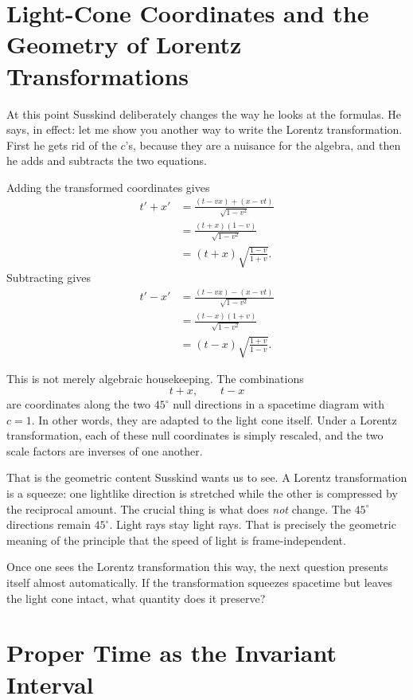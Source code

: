 \section{Light-Cone Coordinates and the Geometry of Lorentz Transformations}

At this point Susskind deliberately changes the way he looks at the formulas. He says, in effect: let me show you another way to write the Lorentz transformation. First he gets rid of the \(c\)'s, because they are a nuisance for the algebra, and then he adds and subtracts the two equations.

Adding the transformed coordinates gives
\begin{align}
t'+x'
&= \frac{(t-vx)+(x-vt)}{\sqrt{1-v^2}} \\
&= \frac{(t+x)(1-v)}{\sqrt{1-v^2}} \\
&= (t+x)\sqrt{\frac{1-v}{1+v}}.
\end{align}
Subtracting gives
\begin{align}
t'-x'
&= \frac{(t-vx)-(x-vt)}{\sqrt{1-v^2}} \\
&= \frac{(t-x)(1+v)}{\sqrt{1-v^2}} \\
&= (t-x)\sqrt{\frac{1+v}{1-v}}.
\end{align}

This is not merely algebraic housekeeping. The combinations
\begin{equation}
t+x, \qquad t-x
\end{equation}
are coordinates along the two \(45^\circ\) null directions in a spacetime diagram with \(c=1\). In other words, they are adapted to the light cone itself. Under a Lorentz transformation, each of these null coordinates is simply rescaled, and the two scale factors are inverses of one another.

That is the geometric content Susskind wants us to see. A Lorentz transformation is a squeeze: one lightlike direction is stretched while the other is compressed by the reciprocal amount. The crucial thing is what does \emph{not} change. The \(45^\circ\) directions remain \(45^\circ\). Light rays stay light rays. That is precisely the geometric meaning of the principle that the speed of light is frame-independent.

Once one sees the Lorentz transformation this way, the next question presents itself almost automatically. If the transformation squeezes spacetime but leaves the light cone intact, what quantity does it preserve?

\section{Proper Time as the Invariant Interval}

